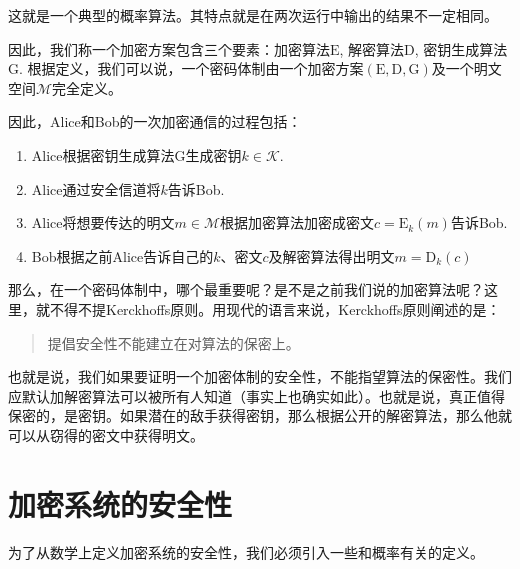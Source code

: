 \documentclass[UTF8]{ctexrep}
\def\pth#1{\left( {#1}\right)}
\def\E#1#2{{\mathrm{E}_{#1}\left({#2}\right)}}
\def\D#1#2{{\mathrm{D}_{#1}\left({#2}\right)}}
\begin{document}
这就是一个典型的概率算法。其特点就是在两次运行中输出的结果不一定相同。\par
因此，我们称一个加密方案包含三个要素：加密算法$\mathrm{E}$, 解密算法$\mathrm{D}$, 密钥生成算法$\mathrm{G}$. 根据定义，我们可以说，一个密码体制由一个加密方案$\pth{\mathrm{E}, \mathrm{D}, \mathrm{G}}$及一个明文空间$\mathcal{M}$完全定义。\par
因此，Alice和Bob的一次加密通信的过程包括：
\begin{enumerate}
    \item Alice根据密钥生成算法$\mathrm{G}$生成密钥$k\in\mathcal{K}$.
    \item Alice通过安全信道将$k$告诉Bob.
    \item Alice将想要传达的明文$m\in\mathcal{M}$根据加密算法加密成密文$c=\E{k}{m}$告诉Bob.
    \item Bob根据之前Alice告诉自己的$k$、密文$c$及解密算法得出明文$m=\D{k}{c}$
\end{enumerate}

那么，在一个密码体制中，哪个最重要呢？是不是之前我们说的加密算法呢？这里，就不得不提Kerckhoffs原则。用现代的语言来说，Kerckhoffs原则阐述的是：
\begin{quote}
    提倡安全性不能建立在对算法的保密上。
\end{quote}

也就是说，我们如果要证明一个加密体制的安全性，不能指望算法的保密性。我们应默认加解密算法可以被所有人知道（事实上也确实如此）。也就是说，真正值得保密的，是密钥。如果潜在的敌手获得密钥，那么根据公开的解密算法，那么他就可以从窃得的密文中获得明文。
\section{加密系统的安全性}
为了从数学上定义加密系统的安全性，我们必须引入一些和概率有关的定义。
\end{document}
